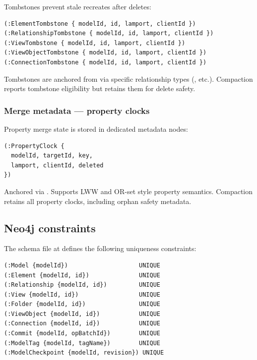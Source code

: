 Tombstones prevent stale recreates after deletes:

\begin{lstlisting}[caption={Tombstone nodes}]
(:ElementTombstone { modelId, id, lamport, clientId })
(:RelationshipTombstone { modelId, id, lamport, clientId })
(:ViewTombstone { modelId, id, lamport, clientId })
(:ViewObjectTombstone { modelId, id, lamport, clientId })
(:ConnectionTombstone { modelId, id, lamport, clientId })
\end{lstlisting}

Tombstones are anchored from  via specific relationship types
(, etc.). Compaction reports tombstone
eligibility but retains them for delete safety.

\subsubsection{Merge metadata --- property clocks}

Property merge state is stored in dedicated metadata nodes:

\begin{lstlisting}[caption={PropertyClock node}]
(:PropertyClock {
  modelId, targetId, key,
  lamport, clientId, deleted
})
\end{lstlisting}

Anchored via .
Supports LWW and OR-set style property semantics. Compaction retains all
property clocks, including orphan safety metadata.

\subsection{Neo4j constraints}

The schema file at  defines the following
uniqueness constraints:

\begin{lstlisting}[caption={Uniqueness constraints}]
(:Model {modelId})                    UNIQUE
(:Element {modelId, id})              UNIQUE
(:Relationship {modelId, id})         UNIQUE
(:View {modelId, id})                 UNIQUE
(:Folder {modelId, id})               UNIQUE
(:ViewObject {modelId, id})           UNIQUE
(:Connection {modelId, id})           UNIQUE
(:Commit {modelId, opBatchId})        UNIQUE
(:ModelTag {modelId, tagName})        UNIQUE
(:ModelCheckpoint {modelId, revision}) UNIQUE
\end{lstlisting}

